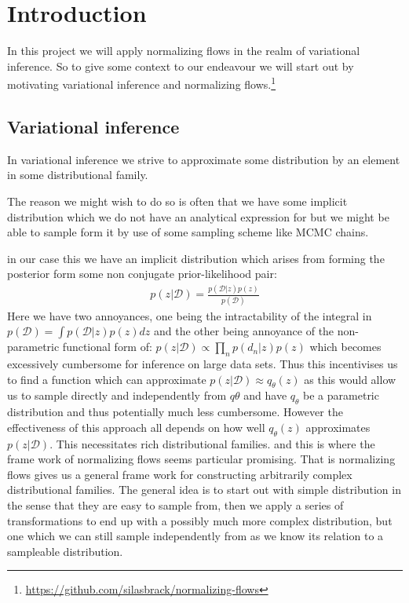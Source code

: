 \section{Introduction}
In this project we will apply normalizing flows\cite{rezende2015variational,papamakarios2019normalizing} in the realm of variational inference.
So to give some context to our endeavour we will start out by motivating variational inference and normalizing flows.\footnote{\url{https://github.com/silasbrack/normalizing-flows}}

\subsection{Variational inference}

In variational inference we strive to approximate some distribution by an element in some distributional family.

The reason we might wish to do so is often that we have some implicit distribution which we do not have an analytical expression for but we might be able to sample form it by use of some sampling scheme like MCMC chains.

in our case this we have an implicit distribution which arises from forming the posterior form some non conjugate prior-likelihood pair:
\begin{align*}
    p(z|\mathcal{D})=\frac{p(\mathcal{D}|z)p(z)}{p(\mathcal{D})}
\end{align*}
Here we have two annoyances, one being the intractability of the integral in $p(\mathcal{D})=\int p(\mathcal{D}|z)p(z)dz$ and the other being annoyance of the non-parametric functional form of: $p(z|\mathcal{D})\propto \prod_n p(d_n|z)p(z)$
which becomes excessively cumbersome for inference on large data sets. Thus this incentivises us to find a function which can approximate $p(z|\mathcal{D})\approx q_\theta(z)$ as this would allow us to sample directly and independently from $q\theta$ and have $q_\theta$ be a parametric distribution and thus potentially much less cumbersome.
However the effectiveness of this approach all depends on how well $q_\theta(z)$ approximates $p(z|\mathcal{D})$.
This necessitates rich distributional families.
and this is where the frame work of normalizing flows seems particular promising.
That is normalizing flows gives us a general frame work for constructing arbitrarily complex distributional families.
The general idea is to start out with simple distribution in the sense that they are easy to sample from, then we apply a series of transformations to end up with a possibly much more complex distribution, but one which we can still sample independently from as we know its relation to a sampleable distribution.

